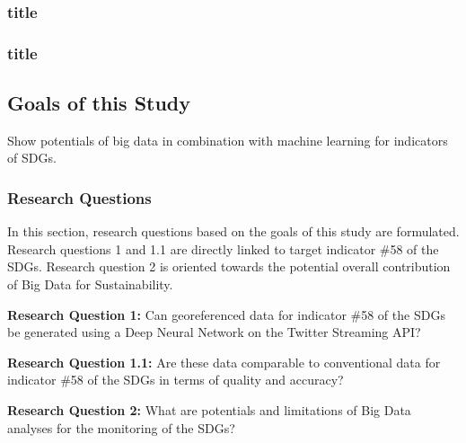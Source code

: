 			\subsubsection{title}
			
			\subsubsection{title}
			
			
			
		\subsection{Goals of this Study}
		
		Show potentials of big data in combination with machine learning for indicators of SDGs.
		
		
		
			\subsubsection{Research Questions}
			
			In this section, research questions based on the goals of this study are formulated. Research questions 1 and 1.1 are directly linked to target indicator \#58 of the SDGs. Research question 2 is oriented towards the potential overall contribution of Big Data for Sustainability.
			
			\bigskip
			
			\begin{tcolorbox}
				\textbf{Research Question 1:} \smallskip Can georeferenced data for indicator \#58 of the SDGs be generated using a Deep Neural Network on the Twitter Streaming API?
			\end{tcolorbox}
			
			\bigskip
				
				\begin{tcolorbox}
					\textbf{Research Question 1.1:} \smallskip Are these data comparable to conventional data for indicator \#58 of the SDGs in terms of quality and accuracy?
				\end{tcolorbox}
				
			\bigskip
				
				\begin{tcolorbox}
					\textbf{Research Question 2:} \smallskip What are potentials and limitations of Big Data analyses for the monitoring of the SDGs?
				\end{tcolorbox}

			\bigskip
				
	
			